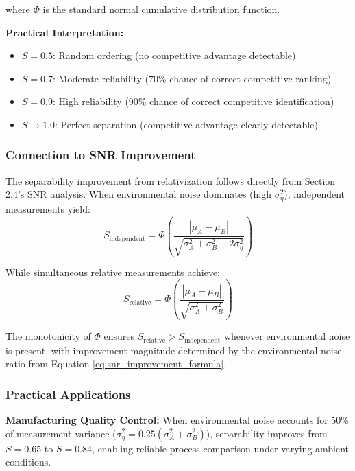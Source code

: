 where $\Phi$ is the standard normal cumulative distribution function.

\textbf{Practical Interpretation:}
\begin{itemize}
\item $S = 0.5$: Random ordering (no competitive advantage detectable)
\item $S = 0.7$: Moderate reliability (70\% chance of correct competitive ranking)  
\item $S = 0.9$: High reliability (90\% chance of correct competitive identification)
\item $S \to 1.0$: Perfect separation (competitive advantage clearly detectable)
\end{itemize}

\subsubsection{Connection to SNR Improvement}

The separability improvement from relativization follows directly from Section 2.4's SNR analysis. When environmental noise dominates (high $\sigma_\eta^2$), independent measurements yield:
\begin{equation}
S_{\text{independent}} = \Phi\left(\frac{|\mu_A - \mu_B|}{\sqrt{\sigma_A^2 + \sigma_B^2 + 2\sigma_\eta^2}}\right)
\end{equation}

While simultaneous relative measurements achieve:
\begin{equation}
S_{\text{relative}} = \Phi\left(\frac{|\mu_A - \mu_B|}{\sqrt{\sigma_A^2 + \sigma_B^2}}\right)
\end{equation}

The monotonicity of $\Phi$ ensures $S_{\text{relative}} > S_{\text{independent}}$ whenever environmental noise is present, with improvement magnitude determined by the environmental noise ratio from Equation \ref{eq:snr_improvement_formula}.

\subsubsection{Practical Applications}

\textbf{Manufacturing Quality Control:} When environmental noise accounts for 50\% of measurement variance ($\sigma_\eta^2 = 0.25(\sigma_A^2 + \sigma_B^2)$), separability improves from $S = 0.65$ to $S = 0.84$, enabling reliable process comparison under varying ambient conditions.

